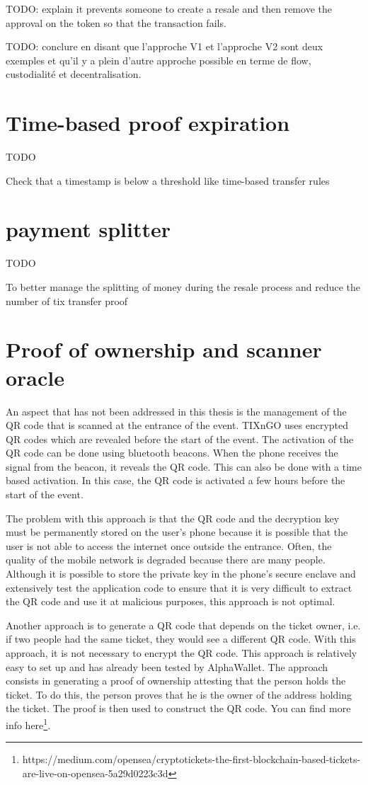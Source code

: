 \documentclass[a4paper,11pt,oneside]{report}
\begin{document}
TODO: explain it prevents someone to create a resale and then remove the approval on the token so that the transaction fails.

TODO: conclure en disant que l'approche V1 et l'approche V2 sont deux exemples et qu'il y a plein d'autre approche possible en terme de flow, custodialité et decentralisation. 

\section{Time-based proof expiration}
TODO

Check that a timestamp is below a threshold like time-based transfer rules

\section{payment splitter}
TODO

To better manage the splitting of money during the resale process and reduce the number of tix transfer proof

\section{Proof of ownership and scanner oracle}
An aspect that has not been addressed in this thesis is the management of the QR code that is scanned at the entrance of the event. TIXnGO uses encrypted QR codes which are revealed before the start of the event. The activation of the QR code can be done using bluetooth beacons. When the phone receives the signal from the beacon, it reveals the QR code. This can also be done with a time based activation. In this case, the QR code is activated a few hours before the start of the event.

The problem with this approach is that the QR code and the decryption key must be permanently stored on the user's phone because it is possible that the user is not able to access the internet once outside the entrance. Often, the quality of the mobile network is degraded because there are many people. Although it is possible to store the private key in the phone's secure enclave and extensively test the application code to ensure that it is very difficult to extract the QR code and use it at malicious purposes, this approach is not optimal.

Another approach is to generate a QR code that depends on the ticket owner, i.e. if two people had the same ticket, they would see a different QR code. With this approach, it is not necessary to encrypt the QR code. This approach is relatively easy to set up and has already been tested by AlphaWallet. The approach consists in generating a proof of ownership attesting that the person holds the ticket. To do this, the person proves that he is the owner of the address holding the ticket. The proof is then used to construct the QR code. You can find more info here\footnote{https://medium.com/opensea/cryptotickets-the-first-blockchain-based-tickets-are-live-on-opensea-5a29d0223c3d}.
\end{document}
